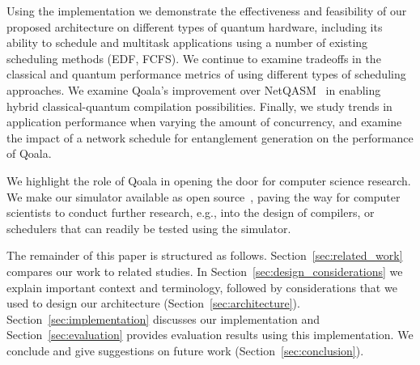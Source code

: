 Using the implementation we demonstrate the effectiveness and feasibility of our proposed architecture on different types of quantum hardware, including its ability to schedule and multitask applications using a number of existing scheduling methods (EDF, FCFS).
We continue to examine tradeoffs in the classical and quantum performance metrics of using different types of scheduling approaches. 
We examine Qoala's improvement over NetQASM~\cite{dahlberg2022netqasm} in enabling hybrid classical-quantum compilation possibilities. 
Finally, we study trends in application performance when varying the amount of concurrency, and examine the impact of a network schedule for entanglement generation on the performance of Qoala.

We highlight the role of Qoala in opening the door for computer science research. We make our simulator available as open source~\cite{qoala2023simulator}, paving the way for computer scientists to conduct further research, e.g., into the design of compilers, or schedulers that can readily be tested using the simulator. 

The remainder of this paper is structured as follows. Section~\ref{sec:related_work} compares our work to related studies. In Section~\ref{sec:design_considerations} we explain important context and terminology, followed by considerations that we used to design our architecture (Section~\ref{sec:architecture}). Section~\ref{sec:implementation} discusses our implementation and Section~\ref{sec:evaluation} provides evaluation results using this implementation. We conclude and give suggestions on future work (Section~\ref{sec:conclusion}).

